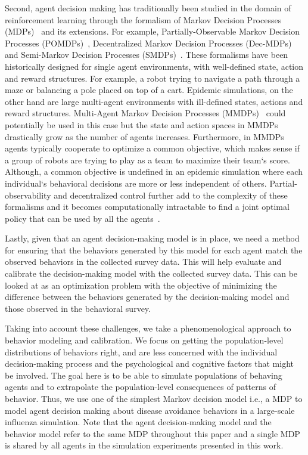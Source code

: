 \documentclass[doublespace]{VTthesis}
\begin{document}
    Second, agent decision making has traditionally been studied in the domain of reinforcement learning through the formalism of Markov Decision Processes (MDPs)~\cite{white1989markov} and its extensions. For example, Partially-Observable Markov Decision Processes (POMDPs)~\cite{kaelbling1998planning}, Decentralized Markov Decision Processes (Dec-MDPs)~\cite{bernstein2002complexity} and Semi-Markov Decision Processes (SMDPs)~\cite{baykal2010semi}. These formalisms have been historically designed for single agent environments, with well-defined state, action and reward structures. For example, a robot trying to navigate a path through a maze or balancing a pole placed on top of a cart. Epidemic simulations, on the other hand are large multi-agent environments with ill-defined states, actions and reward structures. Multi-Agent Markov Decision Processes (MMDPs)~\cite{boutilier1996planning} could potentially be used in this case but the state and action spaces in MMDPs drastically grow as the number of agents increases. Furthermore, in MMDPs agents typically cooperate to optimize a common objective, which makes sense if a group of robots are trying to play as a team to maximize their team`s score. Although, a common objective is undefined in an epidemic simulation where each individual`s behavioral decisions are more or less independent of others. Partial-observability and decentralized control further add to the complexity of these formalisms and it becomes computationally intractable to find a joint optimal policy that can be used by all the agents~\cite{alsheikh2015markov}. 
    
    Lastly, given that an agent decision-making model is in place, we need a method for ensuring that the behaviors generated by this model for each agent match the observed behaviors in the collected survey data. This will help evaluate and calibrate the decision-making model with the collected survey data. This can be looked at as an optimization problem with the objective of minimizing the difference between the behaviors generated by the decision-making model and those observed in the behavioral survey. 
    
    Taking into account these challenges, we take a phenomenological approach to behavior modeling and calibration. We focus on getting the population-level distributions of behaviors right, and are less concerned with the individual decision-making process and the psychological and cognitive factors that might be involved. The goal here is to be able to simulate populations of behaving agents and to extrapolate the population-level consequences of patterns of behavior. Thus, we use one of the simplest Markov decision model i.e., a MDP to model agent decision making about disease avoidance behaviors in a large-scale influenza simulation. Note that the agent decision-making model and the behavior model refer to the same MDP throughout this paper and a single MDP is shared by all agents in the simulation experiments presented in this work.
    
\end{document}
